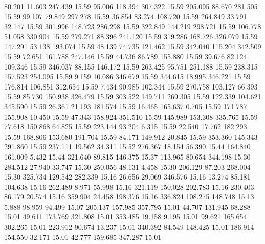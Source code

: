   80.201   11.603  247.439        15.59
  95.006  118.394  307.322        15.59
 205.095   88.670  281.505        15.59
  99.107   79.849  297.278        15.59
  36.854   83.274  108.720        15.59
 264.849   33.791   32.147        15.59
 301.996  148.723  286.298        15.59
 322.849  144.219  298.721        15.59
 106.778   51.058  330.904        15.59
 279.271   88.396  241.120        15.59
 319.286  168.726  326.079        15.59
 147.291   53.138  193.074        15.59
  48.139   74.735  121.462        15.59
 342.040  115.204  342.509        15.59
  72.651  161.788  247.146        15.59
  44.736   86.789  155.880        15.59
  39.676   82.124  109.346        15.59
 346.037   88.155  146.172        15.59
 263.425   95.751  251.188        15.59
 238.315  157.523  254.095        15.59
   9.159   10.086  346.679        15.59
 344.615   18.995  346.221        15.59
 176.814  106.851  312.654        15.59
   7.434   90.985  102.344        15.59
 270.758  103.127   66.393        15.59
  85.730  150.938  326.479        15.59
 303.522  149.711  269.305        15.59
 122.339  104.621  345.590        15.59
  26.361   21.193  181.574        15.59
  16.465  165.637    0.705        15.59
 171.787  155.908   10.450        15.59
  47.343  158.924  351.510        15.59
 145.989  153.308  335.765        15.59
  77.618  150.868   64.825        15.59
 223.144   93.204    6.315        15.59
  22.540   17.762  182.293        15.59
 168.806  153.680  191.704        15.59
  84.171  149.912   20.845        15.59
 353.360  145.343  291.860        15.59
 237.111   19.562   34.311        15.52
 276.367   18.154   56.390        15.44
 164.840  161.009    5.432        15.44
 321.640   89.815  146.375        15.37
 113.965   80.654  344.198        15.30
 284.512   27.940   33.747        15.30
 250.056   48.131    4.458        15.30
 206.129   87.203  268.004        15.30
 325.734  129.542  282.339        15.16
  26.656   29.069  346.576        15.16
  13.274   85.181  104.638        15.16
 262.489    8.971   55.998        15.16
 321.119  150.028  202.783        15.16
 230.403   86.179   20.574        15.16
 359.904   24.458  198.376        15.16
 336.824  108.275  148.748        15.13
   5.888   98.959   94.499        15.07
 205.137  157.985  357.795        15.01
  44.707  131.945   68.288        15.01
  49.611  173.769  321.808        15.01
 353.485   19.158    9.195        15.01
  99.621  165.654  302.265        15.01
 223.912   90.674   13.237        15.01
 340.392   84.549  148.425        15.01
 186.914  154.550   32.171        15.01
  42.777  159.685  347.287        15.01
